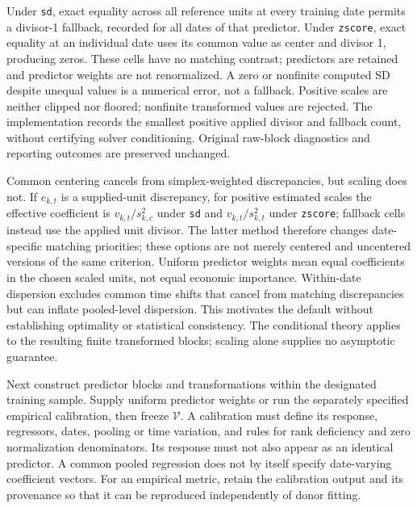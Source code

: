 \documentclass[11pt]{article}
\begin{document}
Under \texttt{sd}, exact equality across all reference units at every
training date permits a divisor-1 fallback, recorded for all dates of that
predictor. Under \texttt{zscore}, exact equality at an individual date uses
its common value as center and divisor 1, producing zeros. These cells
have no matching contrast; predictors are retained and predictor weights
are not renormalized. A zero or nonfinite computed SD despite unequal
values is a numerical error, not a fallback. Positive scales are neither
clipped nor floored; nonfinite transformed values are rejected. The
implementation records the smallest positive applied divisor and fallback
count, without certifying solver conditioning. Original raw-block
diagnostics and reporting outcomes are preserved unchanged.

Common centering cancels from simplex-weighted discrepancies, but scaling
does not. If $e_{k,t}$ is a supplied-unit discrepancy, for positive
estimated scales the effective
coefficient is $v_{k,t}/s_{k,c}^2$ under \texttt{sd} and
$v_{k,t}/s_{k,t}^2$ under \texttt{zscore}; fallback cells instead use the
applied unit divisor. The latter method therefore changes
date-specific matching priorities; these options are not merely centered
and uncentered versions of the same criterion. Uniform predictor weights
mean equal coefficients in the chosen scaled units, not equal economic
importance. Within-date dispersion excludes common time shifts that cancel
from matching discrepancies but can inflate pooled-level dispersion.
This motivates the default without establishing optimality or statistical
consistency. The conditional theory applies to the resulting finite
transformed blocks; scaling alone supplies no asymptotic guarantee.

Next construct predictor blocks and transformations within the designated
training sample. Supply uniform predictor weights or run the separately
specified empirical calibration, then freeze $\mathcal V$. A calibration
must define its response, regressors, dates, pooling or time variation,
and rules for rank deficiency and zero normalization denominators. Its
response must not also appear as an identical predictor. A common pooled
regression does not by itself specify date-varying coefficient vectors.
For an empirical metric, retain the calibration output and its provenance
so that it can be reproduced independently of donor fitting.
\end{document}
